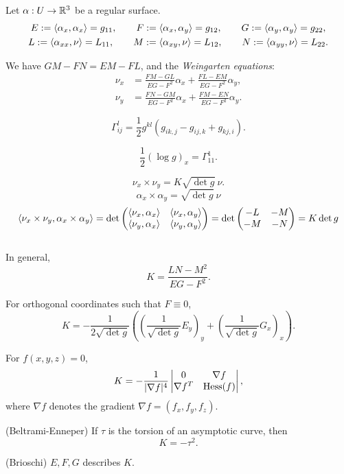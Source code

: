 \documentclass{../note}
\def\a{\alpha}
\begin{document}
\begin{prb}
\begin{defn}
Let $\a:U\to\R^3$ be a regular surface.
\begin{gather*}
E:=\<\a_x,\a_x\>=g_{11},\qquad F:=\<\a_x,\a_y\>=g_{12},\qquad G:=\<\a_y,\a_y\>=g_{22},\\
L:=\<\a_{xx},\nu\>=L_{11},\qquad M:=\<\a_{xy},\nu\>=L_{12},\qquad N:=\<\a_{yy},\nu\>=L_{22}.
\end{gather*}
\end{defn}


\begin{cor}
We have $GM-FN=EM-FL$, and the \emph{Weingarten equations}:
\begin{align*}
\nu_x&=\frac{FM-GL}{EG-F^2}\a_x+\frac{FL-EM}{EG-F^2}\a_y,\\
\nu_y&=\frac{FN-GM}{EG-F^2}\a_x+\frac{FM-EN}{EG-F^2}\a_y.
\end{align*}
\end{cor}



\begin{thm}
\[\Gamma_{ij}^l=\frac12g^{kl}(g_{ik,j}-g_{ij,k}+g_{kj,i}).\]
\end{thm}

\[\frac12(\log g)_x=\Gamma_{11}^1.\]

\[\nu_x\times\nu_y=K\sqrt{\det g}\ \nu.\]
\[\a_x\times\a_y=\sqrt{\det g}\ \nu\]
\[\<\nu_x\times\nu_y,\a_x\times\a_y\>=\det\mat{\<\nu_x,\a_x\>&\<\nu_x,\a_y\>\\\<\nu_y,\a_x\>&\<\nu_y,\a_y\>}=\det\mat{-L&-M\\-M&-N}=K\det g\]











\begin{thm}
$ $\\[-12pt]
\begin{parts}
\item
In general,
\[K=\frac{LN-M^2}{EG-F^2}.\]
\item
For orthogonal coordinates such that $F\equiv0$,
\[K=-\frac1{2\sqrt{\det g}}\left((\frac1{\sqrt{\det g}}E_y)_y+(\frac1{\sqrt{\det g}}G_x)_x\right).\]
\item
For $f(x,y,z)=0$,
\[K=-\frac1{|\nabla f|^4}\mat[v]{0&\nabla f\\\nabla f^T&\Hess(f)},\]
where $\nabla f$ denotes the gradient $\nabla f=(f_x,f_y,f_z)$.
\item(Beltrami-Enneper) If $\tau$ is the torsion of an asymptotic curve, then
\[K=-\tau^2.\]
\item(Brioschi) $E,F,G$ describes $K$.
\end{parts}
\end{thm}


\end{prb}
\end{document}
